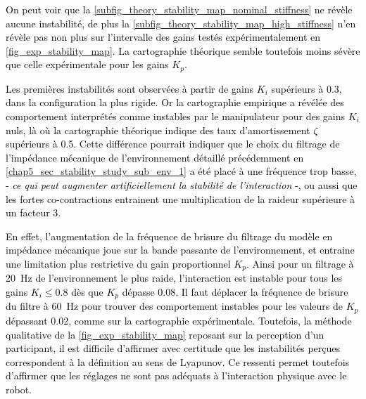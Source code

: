 \textcolor{black}{On peut voir que la \cref{subfig_theory_stability_map_nominal_stiffness} ne révèle aucune instabilité, de plus la \cref{subfig_theory_stability_map_high_stiffness} n'en révèle pas non plus sur l'intervalle des gains testés expérimentalement en \cref{fig_exp_stability_map}. La cartographie théorique semble toutefois moins sévère que celle expérimentale pour les gains $K_p$.} 



\textcolor{black}{Les premières instabilités sont observées à partir de gains $K_i$ supérieurs à 0.3, dans la configuration la plus rigide. Or la cartographie empirique a révélée des comportement interprétés comme instables par le manipulateur pour des gains $K_i$ nuls, là où la cartographie théorique indique des taux d'amortissement $\zeta$ supérieurs à 0.5. Cette différence pourrait indiquer que le choix du filtrage de l'impédance mécanique de l'environnement détaillé précédemment en \cref{chap5_sec_stability_study_sub_env_1} a été placé à une fréquence trop basse, - \textit{ce qui peut augmenter artificiellement la stabilité de l'interaction }-, ou aussi que les fortes co-contractions entrainent une multiplication de la raideur supérieure à un facteur 3.}

\textcolor{black}{En effet, l'augmentation de la fréquence de brisure du filtrage du modèle en impédance mécanique joue sur la bande passante de l'environnement, et entraine une limitation plus restrictive du gain proportionnel $K_p$. Ainsi pour un filtrage à \SI{20}{\hertz} de l'environnement le plus raide, l'interaction est instable pour tous les gains $K_i\leq0.8$ dès que $K_p$ dépasse 0.08. Il faut déplacer la fréquence de brisure du filtre à \SI{60}{\hertz} pour trouver des comportement instables pour les valeurs de $K_p$ dépassant 0.02, comme sur la cartographie expérimentale. Toutefois, la méthode qualitative de la \cref{fig_exp_stability_map} reposant sur la perception d'un participant, il est difficile d'affirmer avec certitude que les instabilités perçues correspondent à la définition au sens de Lyapunov. Ce ressenti permet toutefois d'affirmer que les réglages ne sont pas adéquats à l'interaction physique avec le robot.}

